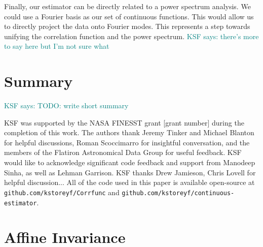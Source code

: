 \documentclass[modern]{aastex62}
\newcommand{\KSF}[1]{\textcolor{teal}{KSF says: #1}}
\begin{document}
Finally, our estimator can be directly related to a power spectrum analysis.
We could use a Fourier basis as our set of continuous functions.
This would allow us to directly project the data onto Fourier modes.
This represents a step towards unifying the correlation function and the power spectrum. \KSF{there's more to say here but I'm not sure what}


\section{Summary}

\KSF{TODO: write short summary}

\acknowledgements
KSF was supported by the NASA FINESST grant [grant number] during the completion of this work.
The authors thank Jeremy Tinker and Michael Blanton for helpful discussions, Roman Scoccimarro for insightful conversation, and the members of the Flatiron Astronomical Data Group for useful feedback.
KSF would like to acknowledge significant code feedback and support from Manodeep Sinha, as well as Lehman Garrison.
KSF thanks Drew Jamieson, Chris Lovell for helpful discussion...
All of the code used in this paper is available open-source at \texttt{github.com/kstoreyf/Corrfunc} and \texttt{github.com/kstoreyf/continuous-estimator}. 

\appendix
\section{Affine Invariance}\label{sec:affine}
\end{document}
